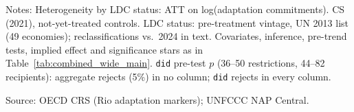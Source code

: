 \begin{table}[H]
\centering
\caption{Heterogeneity by LDC status: ATT on log(adaptation commitments)}
\label{tab:het_ldc_wide}
\begingroup\small
{}
\endgroup
\par\vspace{4pt}
\begin{minipage}{\linewidth}\footnotesize
Notes: Heterogeneity by LDC status: ATT on log(adaptation commitments). CS (2021), not-yet-treated controls. LDC status: pre-treatment vintage, UN 2013 list (49 economies); reclassifications vs.\ 2024 in text. Covariates, inference, pre-trend tests, implied effect and significance stars as in Table~\ref{tab:combined_wide_main}. \texttt{did} pre-test $p$ (36--50 restrictions, 44--82 recipients): aggregate rejects (5\%) in no column; \texttt{did} rejects in every column.\par
Source: OECD CRS (Rio adaptation markers); UNFCCC NAP Central.
\end{minipage}
\end{table}
